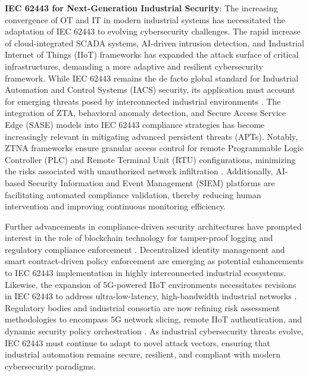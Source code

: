     \textbf{IEC 62443 for Next-Generation Industrial Security}:
    The increasing convergence of OT and IT in modern industrial systems has necessitated the adaptation of IEC 62443 to evolving cybersecurity challenges. The rapid increase of cloud-integrated SCADA systems, AI-driven intrusion detection, and Industrial Internet of Things (IIoT) frameworks has expanded the attack surface of critical infrastructures, demanding a more adaptive and resilient cybersecurity framework. While IEC 62443 remains the de facto global standard for Industrial Automation and Control Systems (IACS) security, its application must account for emerging threats posed by interconnected industrial environments \cite{leander2019applicability}. The integration of ZTA, behavioral anomaly detection, and Secure Access Service Edge (SASE) models into IEC 62443 compliance strategies has become increasingly relevant in mitigating advanced persistent threats (APTs). Notably, ZTNA frameworks ensure granular access control for remote Programmable Logic Controller (PLC) and Remote Terminal Unit (RTU) configurations, minimizing the risks associated with unauthorized network infiltration \cite{gottel2023qualitative}. Additionally, AI-based Security Information and Event Management (SIEM) platforms are facilitating automated compliance validation, thereby reducing human intervention and improving continuous monitoring efficiency.

    Further advancements in compliance-driven security architectures have prompted interest in the role of blockchain technology for tamper-proof logging and regulatory compliance enforcement \cite{heinl2023standard}. Decentralized identity management and smart contract-driven policy enforcement are emerging as potential enhancements to IEC 62443 implementation in highly interconnected industrial ecosystems. Likewise, the expansion of 5G-powered IIoT environments necessitates revisions in IEC 62443 to address ultra-low-latency, high-bandwidth industrial networks \cite{moyon2020integration}. Regulatory bodies and industrial consortia are now refining risk assessment methodologies to encompass 5G network slicing, remote IIoT authentication, and dynamic security policy orchestration \cite{oberhofer2023market}. As industrial cybersecurity threats evolve, IEC 62443 must continue to adapt to novel attack vectors, ensuring that industrial automation remains secure, resilient, and compliant with modern cybersecurity paradigms.
